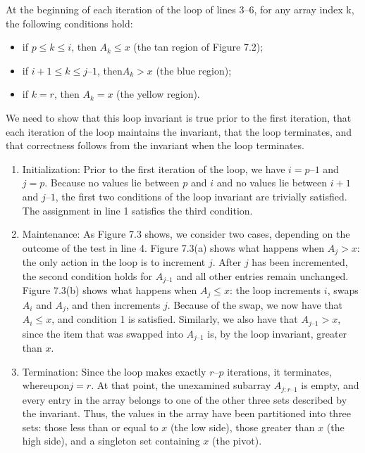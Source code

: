 At the beginning of each iteration of the loop of lines 3–6, for any array index k, the following conditions hold:
\begin{itemize}
  \item  if $p \le k \le i$, then $A_{k} \le x$ (the tan region of Figure 7.2);
  \item  if $i + 1 \le k \le j – 1$, then$ A_{k} > x$ (the blue region);
  \item  if $k = r$, then $A_{k} = x$ (the yellow region).
\end{itemize}
We need to show that this loop invariant is true prior to the first iteration, that each iteration of the loop maintains the invariant, that the loop terminates, and that correctness follows from the invariant when the loop terminates.

\begin{enumerate}
  \item Initialization: Prior to the first iteration of the loop, we have $i = p – 1$ and $ j= p$. Because no values lie between $p$ and $i$ and no values lie between $i + 1$ and $j – 1$, the first two conditions of the loop invariant are trivially satisfied. The assignment in line 1 satisfies the third condition.
  \item Maintenance: As Figure 7.3 shows, we consider two cases, depending on the outcome of the test in line 4. Figure 7.3(a) shows what happens when $A_{j} > x$: the only action in the loop is to increment $j$. After $j$  has been incremented, the second condition holds for $A_{j – 1}$ and all other entries remain unchanged. Figure 7.3(b) shows what happens when $A_{j} \le x$: the loop increments $i$, swaps $A_{i}$ and $A_{j}$, and then increments $j$. Because of the swap, we now have that $A_{i} \le x$, and condition 1 is satisfied. Similarly, we also have that $A_{j – 1} > x$, since the item that was swapped into $A_{j – 1}$ is, by the loop invariant, greater than $x$.
  \item Termination: Since the loop makes exactly $r – p$ iterations, it terminates, whereupon$ j= r$. At that point, the unexamined subarray $A_{j : r – 1}$ is empty, and every entry in the array belongs to one of the other three sets described by the invariant. Thus, the values in the array have been partitioned into three sets: those less than or equal to $x$ (the low side), those greater than $x$ (the high side), and a singleton set containing $x$ (the pivot).


\end{enumerate}

